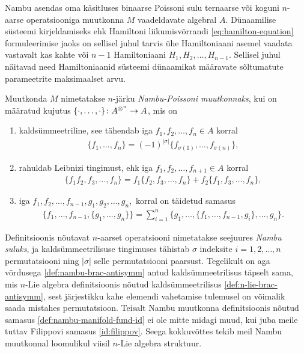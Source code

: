 Nambu asendas oma käsitluses binaarse Poissoni sulu ternaarse või koguni
$n$-aarse operatsiooniga muutkonna $M$ vaadeldavate algebral $A$.
Dünaamilise süsteemi kirjeldamiseks ehk Hamiltoni liikumisvõrrandi
\eqref{eq:hamilton-equation} formuleerimise jaoks on
sellisel juhul tarvis ühe Hamiltoniaani asemel vaadata vastavalt kas kahte
või $n-1$ Hamiltoniaani $H_1, H_2, \dots, H_{n-1}$.
Sellisel juhul näitavad need Hamiltoniaanid süsteemi
dünaamikat määravate sõltumatute parameetrite maksimaalset arvu.

\begin{dfn}
    Muutkonda $M$ nimetatakse $n$-järku \emph{Nambu-Poissoni muutkonnaks},
    kui on määratud kujutus
    $\{\cdot, \dots, \cdot\} \colon A^{\otimes^n} \to A$, mis on
    \begin{enumerate}
        \item kaldsümmeetriline, see tähendab iga $f_1, f_2, \dots, f_n \in A$
            korral
            \begin{align}\label{def:nambu-brac-antisymm}
                \{f_1, \dots, f_n\} = (-1)^{|\sigma|}
                \{f_{\sigma(1)}, \dots, f_{\sigma(n)}\},
            \end{align}
        \item rahuldab Leibnizi tingimust, ehk iga
            $f_1, f_2, \dots, f_{n+1} \in A$ korral
            \begin{align}
                \{f_1 f_2, f_3, \dots, f_n\} =
                f_1 \{f_2, f_3, \dots, f_n\} +
                f_2 \{f_1, f_3, \dots, f_n\},
            \end{align}
        \item iga $f_1, f_2, \dots, f_{n-1}, g_1, g_2, \dots, g_n,$ korral on
        täidetud samasus
            \begin{align}\label{def:nambu-manifold-fund-id}
                \{f_1, \dots, f_{n-1}, \{g_1, \dots, g_n\}\} =
                \sum_{i=1}^{n} \{
                    g_1, \dots, \{f_1, \dots, f_{n-1}, g_i\}, \dots, g_n
                \}.
            \end{align}
    \end{enumerate}
\end{dfn}

Definitsioonis nõutavat $n$-aarset operatsiooni nimetatakse seejuures
\emph{Nambu suluks}, ja kaldsümmeetrilisuse tingimuses tähistab
$\sigma$ indeksite $i = 1, 2, \dots, n$ permutatsiooni ning
$|\sigma|$ selle permutatsiooni paarsust. Tegelikult on
aga võrdusega \eqref{def:nambu-brac-antisymm} antud kaldsümmeetrilisus
täpselt sama, mis $n$-Lie algebra definitsioonis nõutud kaldsümmeetrilisus
\eqref{def:n-lie-brac-antisymm}, sest järjestikku kahe elemendi vahetamise
tulemusel on võimalik saada mistahes permutatsioon. Teisalt Nambu
muutkonna definitsioonis nõutud samasus \eqref{def:nambu-manifold-fund-id}
ei ole mitte midagi muud, kui juba meile tuttav Filippovi samasus
\eqref{id:filippov}. Seega kokkuvõttes tekib meil Nambu muutkonnal
loomulikul viisil $n$-Lie algebra struktuur.

